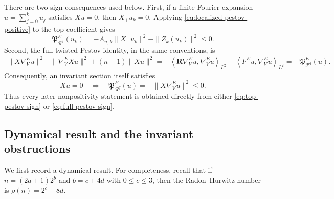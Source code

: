 \documentclass[reqno,11pt]{amsart}
\theoremstyle{definition}
\newcommand{\Rop}{\mathscr R}
\newcommand{\inner}[2]{\left\langle #1,#2\right\rangle}
\begin{document}
There are two sign consequences used below.  First, if a finite Fourier
expansion $u=\sum_{j=0}^ku_j$ satisfies $Xu=0$, then
$X_+u_k=0$.  Applying \eqref{eq:localized-pestov-positive} to the top
coefficient gives
\begin{equation}\label{eq:top-pestov-sign}
  \mathfrak P_{\Rop^g}^E(u_k)
  =-A_{n,k}\|X_-u_k\|^2-\|Z_k(u_k)\|^2\leq0.
\end{equation}
Second, the full twisted Pestov identity, in the same conventions, is
\cite[Proposition~3.3]{GPSU16}
\begin{equation*}
\begin{split}
  \|X\nabla_V^Eu\|^2-\|\nabla_V^EXu\|^2+(n-1)\|Xu\|^2
  ={}&\inner{\mathbf R\nabla_V^Eu}{\nabla_V^Eu}_{L^2}+\inner{F^Eu}{\nabla_V^Eu}_{L^2}
  =-\mathfrak P_{\Rop^g}^E(u).
\end{split}
\end{equation*}
Consequently, an invariant section itself satisfies
\begin{equation}\label{eq:full-pestov-sign}
  Xu=0
  \quad\Longrightarrow\quad
  \mathfrak P_{\Rop^g}^E(u)
  =-\|X\nabla_V^Eu\|^2\leq0.
\end{equation}
Thus every later nonpositivity statement is obtained directly from either
\eqref{eq:top-pestov-sign} or \eqref{eq:full-pestov-sign}.
\subsection{Dynamical result and the invariant obstructions}

We first record a dynamical result.  For completeness, recall that if
$n=(2a+1)2^b$ and $b=c+4d$ with $0\leq c\leq3$, then the
Radon--Hurwitz number is $\rho(n)=2^c+8d$.
\end{document}
